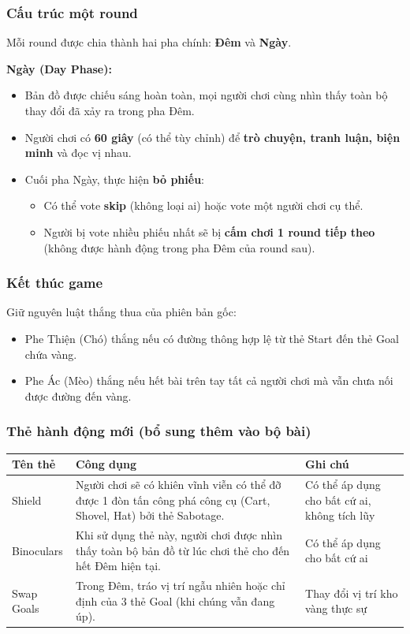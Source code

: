 \begin{frame}
\frametitle{Cấu trúc một round}
Mỗi round được chia thành hai pha chính: \textbf{Đêm} và \textbf{Ngày}.

\textbf{Ngày (Day Phase):}
    \begin{itemize}
        \item Bản đồ được chiếu sáng hoàn toàn, mọi người chơi cùng nhìn thấy toàn bộ thay đổi đã xảy ra trong pha Đêm.
        \item Người chơi có \textbf{60 giây} (có thể tùy chỉnh) để \textbf{trò chuyện, tranh luận, biện minh} và đọc vị nhau.
        \item Cuối pha Ngày, thực hiện \textbf{bỏ phiếu}:
        \begin{itemize}
            \item Có thể vote \textbf{skip} (không loại ai) hoặc vote một người chơi cụ thể.
            \item Người bị vote nhiều phiếu nhất sẽ bị \textbf{cấm chơi 1 round tiếp theo} (không được hành động trong pha Đêm của round sau).
        \end{itemize}
    \end{itemize}

\end{frame}


\begin{frame}
\frametitle{Kết thúc game}
Giữ nguyên luật thắng thua của phiên bản gốc:
\begin{itemize}
\item Phe Thiện (Chó) thắng nếu có đường thông hợp lệ từ thẻ Start đến thẻ Goal chứa vàng.
\item Phe Ác (Mèo) thắng nếu hết bài trên tay tất cả người chơi mà vẫn chưa nối được đường đến vàng.
\end{itemize}

\end{frame}

\begin{frame}
\frametitle{Thẻ hành động mới (bổ sung thêm vào bộ bài)}
\begin{table}[H]
\centering
\begin{tabular}{|l|p{7cm}|p{5cm}|}
\hline
\textbf{Tên thẻ} & \textbf{Công dụng} & \textbf{Ghi chú} \\ \hline
Shield & Người chơi sẽ có khiên vĩnh viễn có thể đỡ được 1 đòn tấn công phá công cụ (Cart, Shovel, Hat) bởi thẻ Sabotage. & Có thể áp dụng cho bất cứ ai, không tích lũy \\ \hline
Binoculars & Khi sử dụng thẻ này, người chơi được nhìn thấy toàn bộ bản đồ từ lúc chơi thẻ cho đến hết Đêm hiện tại. & Có thể áp dụng cho bất cứ ai\\ \hline
Swap Goals & Trong Đêm, tráo vị trí ngẫu nhiên hoặc chỉ định của 3 thẻ Goal (khi chúng vẫn đang úp). & Thay đổi vị trí kho vàng thực sự \\ \hline
\end{tabular}
\end{table}     

\end{frame}